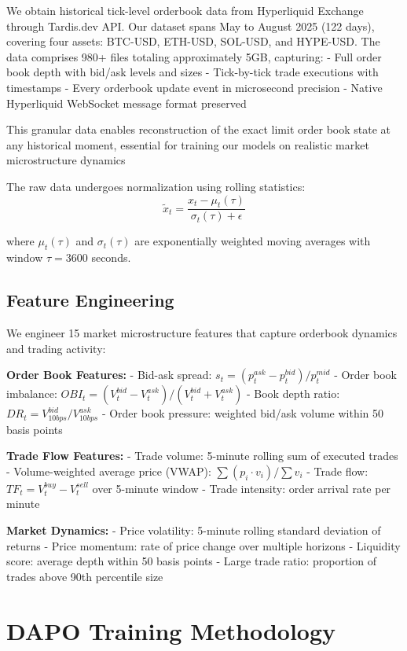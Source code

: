 \documentclass{report}
\begin{document}
We obtain historical tick-level orderbook data from Hyperliquid Exchange through Tardis.dev API. Our dataset spans May to August 2025 (122 days), covering four assets: BTC-USD, ETH-USD, SOL-USD, and HYPE-USD. The data comprises 980+ files totaling approximately 5GB, capturing:
- Full order book depth with bid/ask levels and sizes
- Tick-by-tick trade executions with timestamps
- Every orderbook update event in microsecond precision
- Native Hyperliquid WebSocket message format preserved

This granular data enables reconstruction of the exact limit order book state at any historical moment, essential for training our models on realistic market microstructure dynamics \cite{Tardis2024}

The raw data undergoes normalization using rolling statistics:
\begin{equation}
\tilde{x}_t = \frac{x_t - \mu_t(\tau)}{\sigma_t(\tau) + \epsilon}
\end{equation}

where $\mu_t(\tau)$ and $\sigma_t(\tau)$ are exponentially weighted moving averages with window $\tau = 3600$ seconds.

\subsection{Feature Engineering}

We engineer 15 market microstructure features that capture orderbook dynamics and trading activity:

\textbf{Order Book Features:}
- Bid-ask spread: $s_t = (p^{ask}_t - p^{bid}_t) / p^{mid}_t$
- Order book imbalance: $OBI_t = (V^{bid}_t - V^{ask}_t) / (V^{bid}_t + V^{ask}_t)$
- Book depth ratio: $DR_t = V^{bid}_{10bps} / V^{ask}_{10bps}$
- Order book pressure: weighted bid/ask volume within 50 basis points

\textbf{Trade Flow Features:}
- Trade volume: 5-minute rolling sum of executed trades
- Volume-weighted average price (VWAP): $\sum(p_i \cdot v_i) / \sum v_i$
- Trade flow: $TF_t = V^{buy}_t - V^{sell}_t$ over 5-minute window
- Trade intensity: order arrival rate per minute

\textbf{Market Dynamics:}
- Price volatility: 5-minute rolling standard deviation of returns
- Price momentum: rate of price change over multiple horizons
- Liquidity score: average depth within 50 basis points
- Large trade ratio: proportion of trades above 90th percentile size

\section{DAPO Training Methodology}
\end{document}
